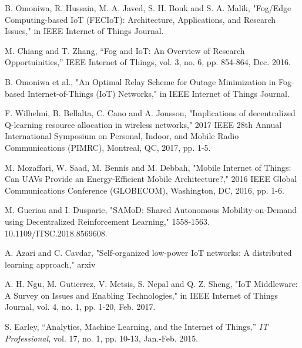 \documentclass[journal]{IEEEtran}
\begin{document}
%
%
%
\begin{thebibliography}{1}
B. Omoniwa, R. Hussain, M. A. Javed, S. H. Bouk and S. A. Malik, "Fog/Edge Computing-based IoT (FECIoT): Architecture, Applications, and Research Issues," in IEEE Internet of Things Journal.

M. Chiang and T. Zhang, ``Fog and IoT: An Overview of Research Opportuinities,'' IEEE Internet of Things, vol. 3, no. 6, pp. 854-864, Dec.
2016.

B. Omoniwa et al., "An Optimal Relay Scheme for Outage Minimization in Fog-based Internet-of-Things (IoT) Networks," in IEEE Internet of Things Journal.

F. Wilhelmi, B. Bellalta, C. Cano and A. Jonsson, "Implications of decentralized Q-learning resource allocation in wireless networks," 2017 IEEE 28th Annual International Symposium on Personal, Indoor, and Mobile Radio Communications (PIMRC), Montreal, QC, 2017, pp. 1-5.

M. Mozaffari, W. Saad, M. Bennis and M. Debbah, "Mobile Internet of Things: Can UAVs Provide an Energy-Efficient Mobile Architecture?," 2016 IEEE Global Communications Conference (GLOBECOM), Washington, DC, 2016, pp. 1-6.

M. Gueriau and I. Dusparic, "SAMoD: Shared Autonomous Mobility-on-Demand using Decentralized Reinforcement Learning,"  1558-1563. 10.1109/ITSC.2018.8569608.

A. Azari and C. Cavdar, "Self-organized low-power IoT networks: A distributed learning approach," arxiv


A. H. Ngu, M. Gutierrez, V. Metsis, S. Nepal and Q. Z. Sheng, "IoT Middleware: A Survey on Issues and Enabling Technologies," in IEEE Internet of Things Journal, vol. 4, no. 1, pp. 1-20, Feb. 2017.


S. Earley, ``Analytics, Machine Learning, and the Internet of Things,'' \emph{IT Professional,} vol. 17, no. 1, pp. 10-13, Jan.-Feb. 2015.


\end{thebibliography}
\end{document}
